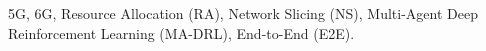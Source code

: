 \documentclass[12pt,lettersize,journal,onecolumn]{IEEEtran}
\begin{document}
\begin{abstract}

\end{abstract}

\begin{IEEEkeywords}
5G, 6G, Resource Allocation (RA), Network Slicing (NS), Multi-Agent Deep Reinforcement Learning (MA-DRL), End-to-End (E2E).
\end{IEEEkeywords} %
\end{document}
